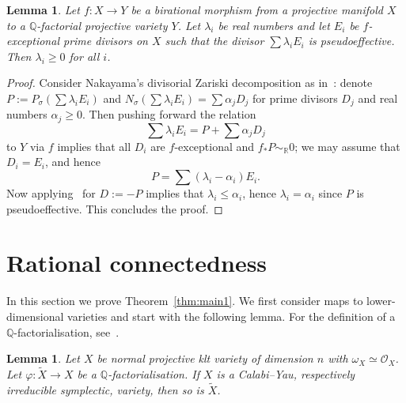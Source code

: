 \documentclass[11pt]{article}
\newtheorem{lemm}[theo]{Lemma}
\theoremstyle{definition}
\numberwithin{equation}{section}
\numberwithin{figure}{section}
\numberwithin{table}{section}
\newcommand{\R}{\mathbb{R}}
\newcommand{\Qbb}{\mathbb{Q}} %
\newcommand{\OO}{\mathcal{O}}
\begin{document}
\begin{lemm}\label{lem:exceptional}
Let $f\colon X\to Y$ be a birational morphism from a projective manifold $X$ to a $\Qbb$-factorial projective variety $Y$. Let $\lambda_i$ be real numbers and let $E_i$ be $f$-exceptional prime divisors on $X$ such that the divisor $\sum \lambda_i E_i$ is pseudoeffective. Then $\lambda_i\geq0$ for all $i$.
\end{lemm}

\begin{proof}
Consider Nakayama's divisorial Zariski decomposition as in~\cite[Chapter~III]{Nak04}: denote $P:=P_\sigma(\sum \lambda_i E_i)$ and $N_\sigma(\sum \lambda_i E_i)=\sum \alpha_j D_j$ for prime divisors $D_j$ and real numbers $\alpha_j\geq0$. Then pushing forward the relation
\[
\sum \lambda_i E_i=P+\sum \alpha_j D_j
\]
to $Y$ via $f$ implies that all $D_i$ are $f$-exceptional and $f_*P\sim_\R 0$; we may assume that $D_i=E_i$, and hence
\[
P=\sum(\lambda_i-\alpha_i)E_i.
\]
Now applying~\cite[Lemma~3.3]{Bir12} for $D:=-P$ implies that $\lambda_i\leq\alpha_i$, hence $\lambda_i=\alpha_i$ since $P$ is pseudoeffective. This concludes the proof.
\end{proof}

\section{Rational connectedness}\label{sec:ratconn}

In this section we prove Theorem~\ref{thm:main1}. We first consider maps to lower-dimensional varieties and start with the following lemma. For the definition of a $\Qbb$-factorialisation, see~\cite[Corollary~1.37]{Kol13}.

\begin{lemm}\label{lem:reduction}
Let $X$ be normal projective klt variety of dimension $n$ with $\omega_X \simeq \OO_X$. Let $\varphi\colon \widetilde X \to X$ be a $\Qbb$-factorialisation. If $X$ is a Calabi--Yau, respectively irreducible symplectic, variety, then so is $\widetilde X$.
\end{lemm}
\end{document}
